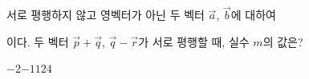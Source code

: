 서로 평행하지 않고 영벡터가 아닌 두 벡터 $\vec{a}$, $\vec{b}$에 대하여 \par\smallskip{}\par\smallskip\noindent 이다. 두 벡터 $\vec{p}+\vec{q}$, $\vec{q}-\vec{r}$가 서로 평행할 때, 실수 $m$의 값은?
\begin{choices32}{$-2$}{$-1$}{$1$}{$2$}{$4$}\end{choices32}
